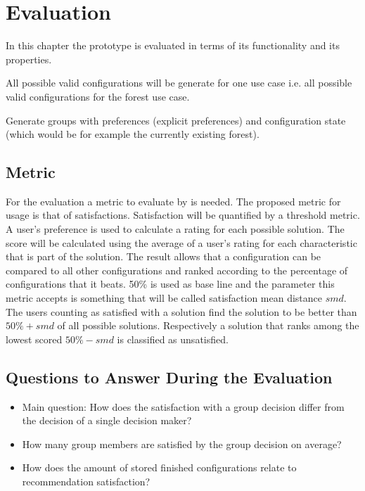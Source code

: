 \chapter{Evaluation}
\label{ch:Evaluation}

In this chapter the prototype is evaluated in terms of its functionality and its properties.

All possible valid configurations will be generate for one use case i.e. all possible valid configurations for the forest use case.

Generate groups with preferences (explicit preferences) and configuration state (which would be for example the currently existing forest).

\section{Metric}
\label{sec:Evaluation:Metrics}

For the evaluation a metric to evaluate by is needed. The proposed metric for usage is that of satisfactions. Satisfaction will be quantified by a threshold metric. A user's preference is used to calculate a rating for each possible solution. The score will be calculated using the average of a user's rating for each characteristic that is part of the solution. The result allows that a configuration can be compared to all other configurations and ranked according to the percentage of configurations that it beats. 50\% is used as base line and the parameter this metric accepts is something that will be called satisfaction mean distance $smd$. The users counting as satisfied with a solution find the solution to be better than $50\% + smd$ of all possible solutions. Respectively a solution that ranks among the lowest scored $50\% - smd$ is classified as unsatisfied.

\section{Questions to Answer During the Evaluation}
\label{sec:Evaluation:Questions}

\begin{itemize}
    \item Main question: How does the satisfaction with a group decision differ from the decision of a single decision maker?
    \item How many group members are satisfied by the group decision on average?
    \item How does the amount of stored finished configurations relate to recommendation satisfaction?
\end{itemize}

